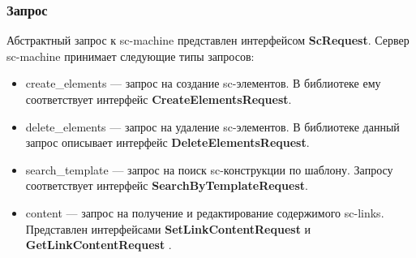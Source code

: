 \subsubsection{Запрос}
Абстрактный запрос к sc-machine представлен интерфейсом \textbf{ScRequest}. Сервер sc-machine принимает следующие типы запросов: 
\begin{itemize}
\item create\_elements --- запрос на создание sc-элементов. В библиотеке ему соответствует интерфейс \textbf{CreateElementsRequest}. 
\item delete\_elements --- запрос на удаление sc-элементов. В библиотеке данный запрос описывает интерфейс \textbf{DeleteElementsRequest}.
\item search\_template --- запрос на поиск sc-конструкции по шаблону. Запросу соответствует интерфейс \textbf{SearchByTemplateRequest}.
\item content --- запрос на получение и редактирование содержимого sc-links. Представлен интерфейсами \textbf{SetLinkContentRequest} и \textbf{GetLinkContentRequest} .
\end{itemize}

